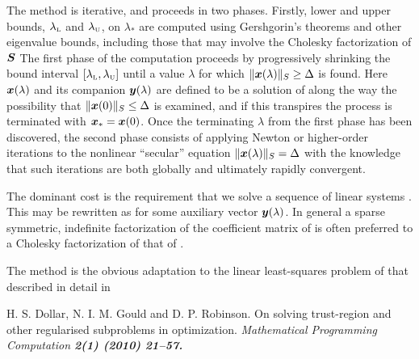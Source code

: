 \documentclass{galahad}
\begin{document}
\noindent
The method is iterative, and proceeds in two phases.
Firstly, lower and upper bounds, $\lambda_{\mbox{\protect\tiny L}}$ and
$\lambda_{\mbox{\protect\tiny U}}$, on $\lambda_*$ are computed
using Gershgorin's theorems and other eigenvalue bounds,
including those that may involve the Cholesky factorization of ${\bm{S}}$  The
first phase of the computation proceeds by progressively shrinking  the bound
interval $[\lambda_{\mbox{\protect\tiny L}},\lambda_{\mbox{\protect\tiny U}}]$
until a value $\lambda$ for which
$\|{\bm{x}}(\lambda)\|_S  \geq  \Delta$ is found.
Here ${\bm{x}}(\lambda)$ and its companion ${\bm{y}}(\lambda)$
are defined to be a solution of
along the way the possibility that
$\|{\bm{x}}(0)\|_S  \leq  \Delta$ is examined, and if this transpires
the process is terminated with ${\bm{x}}_* = {\bm{x}}(0)$.
Once the terminating $\lambda$ from the first phase has been discovered,
the second phase
consists of applying Newton or higher-order iterations to the nonlinear
``secular'' equation $\|{\bm{x}}(\lambda)\|_S  =  \Delta$ with
the knowledge that such iterations are both globally and ultimately
rapidly convergent.

The dominant cost is the requirement that we solve a sequence of linear systems
. This may be rewritten as
for some auxiliary vector ${\bm{y}}(\lambda)$.
In general a sparse symmetric, indefinite factorization of the
coefficient matrix of  is
often preferred to a Cholesky factorization of that of .

\galreference
The method is the obvious adaptation to the linear least-squares
problem of that described in detail in
\vspace*{1mm}

\noindent
H. S. Dollar, N. I. M. Gould and D. P. Robinson.
On solving trust-region and other regularised subproblems in optimization.
\em Mathematical Programming Computation \bf 2(1) \rm (2010) 21--57.

\end{document}
